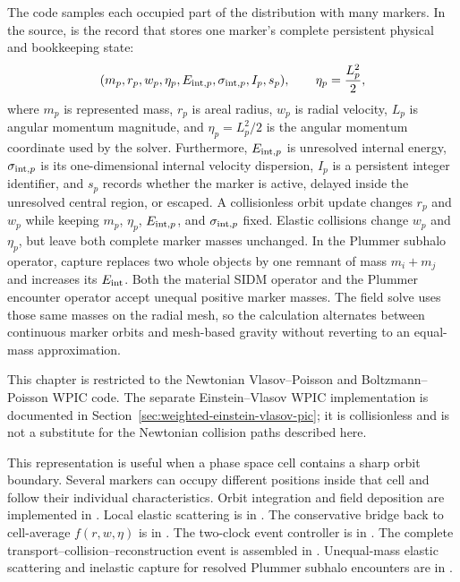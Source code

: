 The code samples each occupied part of the distribution with many markers.
In the source,  is the record that stores one marker's
complete persistent physical and bookkeeping state:
\[
 (m_p,r_p,w_p,\eta_p,E_{{\rm int},p},
   \sigma_{{\rm int},p},I_p,s_p),
 \qquad \eta_p=\frac{L_p^2}{2},
\]
where \(m_p\) is represented mass, \(r_p\) is areal radius, \(w_p\) is radial
velocity, \(L_p\) is angular momentum magnitude, and
\(\eta_p=L_p^2/2\) is the angular momentum coordinate used by the solver.
Furthermore, \(E_{{\rm int},p}\) is unresolved internal energy,
\(\sigma_{{\rm int},p}\) is its one-dimensional internal velocity dispersion,
\(I_p\) is a persistent integer identifier, and \(s_p\) records whether the
marker is active, delayed inside the unresolved central region, or escaped.
A collisionless orbit update changes \(r_p\) and \(w_p\) while
keeping \(m_p\), \(\eta_p\), \(E_{{\rm int},p}\), and
\(\sigma_{{\rm int},p}\) fixed.  Elastic collisions change \(w_p\) and
\(\eta_p\), but leave both complete marker masses unchanged.  In the Plummer
subhalo operator, capture replaces two whole objects by one remnant of mass
\(m_i+m_j\) and increases its \(E_{\rm int}\).  Both the material SIDM
operator and the Plummer encounter operator accept unequal positive marker
masses.  The field solve uses those same masses on the radial mesh, so the
calculation alternates between continuous marker orbits and mesh-based
gravity without reverting to an equal-mass approximation.

This chapter is restricted to the Newtonian Vlasov--Poisson and
Boltzmann--Poisson WPIC code.  The separate Einstein--Vlasov WPIC
implementation is documented in
Section~\ref{sec:weighted-einstein-vlasov-pic}; it is collisionless and is not
a substitute for the Newtonian collision paths described here.

This representation is useful when a phase space cell contains a sharp orbit
boundary.  Several markers can occupy different positions inside that cell
and follow their individual characteristics.  Orbit integration and field
deposition are implemented in .
Local elastic scattering is in
.  The conservative bridge
back to cell-average \(f(r,w,\eta)\) is in
.  The two-clock event
controller is in
.  The complete
transport--collision--reconstruction event is assembled in
.
Unequal-mass elastic scattering and inelastic capture for resolved Plummer
subhalo encounters are in
.

